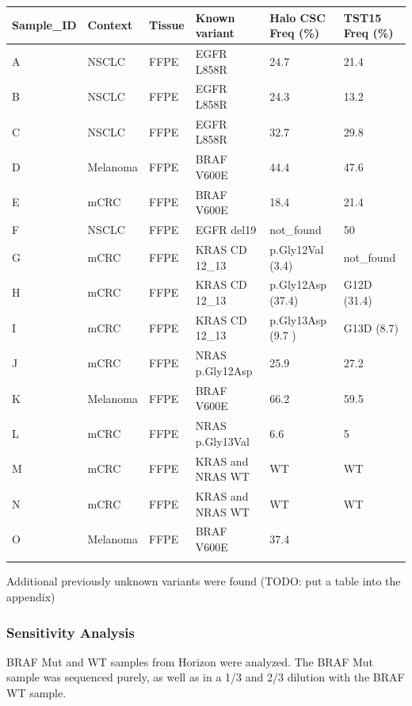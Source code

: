 \begin{table}
\begin{tabular}{p{3.5cm} p{1cm} p{1cm}}\\
\hline
Sample_ID & Context & Tissue & Known variant & Halo CSC Freq (\%) & TST15 Freq (\%) \\
\hline
A & NSCLC & FFPE & EGFR L858R & 24.7 & 21.4 \\
B & NSCLC & FFPE & EGFR L858R & 24.3 & 13.2 \\
C & NSCLC & FFPE & EGFR L858R & 32.7 & 29.8\\
D & Melanoma & FFPE & BRAF V600E & 44.4 & 47.6 \\
E & mCRC & FFPE & BRAF V600E & 18.4 & 21.4 \\
F & NSCLC & FFPE & EGFR del19 & not_found & 50 \\
G & mCRC & FFPE & KRAS CD 12_13 & p.Gly12Val (3.4) & not_found \\
H & mCRC & FFPE & KRAS CD 12_13  & p.Gly12Asp (37.4) & G12D (31.4)\\
I & mCRC & FFPE & KRAS CD 12_13  & p.Gly13Asp (9.7 )& G13D (8.7) \\
J & mCRC & FFPE & NRAS p.Gly12Asp & 25.9 & 27.2 \\
K & Melanoma & FFPE & BRAF V600E & 66.2 & 59.5 \\
L & mCRC & FFPE & NRAS p.Gly13Val & 6.6 & 5 \\
M & mCRC & FFPE & KRAS and NRAS WT & WT & WT \\
N & mCRC & FFPE & KRAS and NRAS WT & WT & WT \\
O & Melanoma & FFPE &BRAF V600E & 37.4 & \\
\label{known_variants}
\end{tabular}
\end{table}

Additional previously unknown variants were found (TODO: put a table into the appendix)

\subsubsection{Sensitivity Analysis}
BRAF Mut and WT samples from Horizon were analyzed. The BRAF Mut sample was
sequenced purely, as well as in a 1/3 and 2/3 dilution with the BRAF WT sample.

